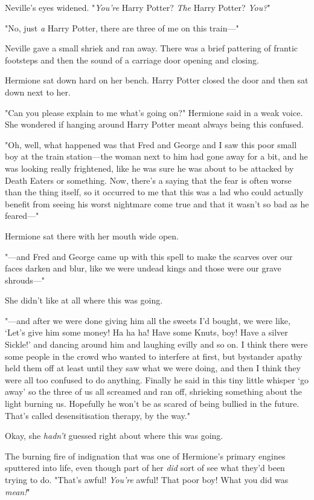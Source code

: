 Neville's eyes widened. "\emph{You're} Harry Potter? \emph{The} Harry Potter? 
\emph{You?}"

"No, just \emph{a} Harry Potter, there are three of me on this train---"

Neville gave a small shriek and ran away. There was a brief pattering of 
frantic footsteps and then the sound of a carriage door opening and closing.

Hermione sat down hard on her bench. Harry Potter closed the door and then sat 
down next to her.

"Can you please explain to me what's going on?" Hermione said in a weak voice. 
She wondered if hanging around Harry Potter meant always being this confused.

"Oh, well, what happened was that Fred and George and I saw this poor small boy 
at the train station---the woman next to him had gone away for a bit, and he 
was looking really frightened, like he was sure he was about to be attacked by 
Death Eaters or something. Now, there's a saying that the fear is often worse 
than the thing itself, so it occurred to me that this was a lad who could 
actually benefit from seeing his worst nightmare come true and that it wasn't 
so bad as he feared---"

Hermione sat there with her mouth wide open.

"---and Fred and George came up with this spell to make the scarves over our 
faces darken and blur, like we were undead kings and those were our grave 
shrouds---"

She didn't like at all where this was going.

"---and after we were done giving him all the sweets I'd bought, we were like, 
`Let's give him some money! Ha ha ha! Have some Knuts, boy! Have a silver 
Sickle!' and dancing around him and laughing evilly and so on. I think there 
were some people in the crowd who wanted to interfere at first, but bystander 
apathy held them off at least until they saw what we were doing, and then I 
think they were all too confused to do anything. Finally he said in this tiny 
little whisper `go away' so the three of us all screamed and ran off, shrieking 
something about the light burning us. Hopefully he won't be as scared of being 
bullied in the future. That's called desensitisation therapy, by the way."

Okay, she \emph{hadn't} guessed right about where this was going.

The burning fire of indignation that was one of Hermione's primary engines 
sputtered into life, even though part of her \emph{did} sort of see what they'd 
been trying to do. "That's awful! \emph{You're} awful! That poor boy! What you 
did was \emph{mean!}"

